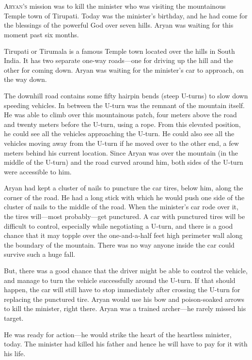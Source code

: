 
\chapter{}

\lettrine{A}{ryan's} mission was to kill the minister who was visiting the mountainous Temple
town of Tirupati. Today was the minister's birthday, and he had come for the
blessings of the powerful God over seven hills. Aryan was waiting for this
moment past six months.

Tirupati or Tirumala is a famous Temple town located over the hills in South
India. It has two separate one-way roads—one for driving up the hill
and the other for coming down. Aryan was waiting for the minister's car to
approach, on the way down.

The downhill road contains some fifty hairpin bends (steep U-turns) to slow down
speeding vehicles. In between the U-turn was the remnant of the mountain itself.
He was able to climb over this mountainous patch, four meters above the road and
twenty meters before the U-turn, using a rope. From this elevated position, he
could see all the vehicles approaching the U-turn. He could also see all the
vehicles moving away from the U-turn if he moved over to the other end, a few
meters behind his current location. Since Aryan was over the mountain (in the
middle of the U-turn) and the road curved around him, both sides of the U-turn
were accessible to him.

Aryan had kept a cluster of nails to puncture the car tires, below him, along
the corner of the road. He had a long stick with which he would push one side of
the cluster of nails to the middle of the road. When the minister's car rode
over it, the tires will—most probably—get punctured. A car with punctured
tires will be difficult to control, especially while negotiating a U-turn, and
there is a good chance that it may topple over the one-and-a-half feet high
perimeter wall along the boundary of the mountain. There was no way anyone
inside the car could survive such a huge fall.

But, there was a good chance that the driver might be able to control the
vehicle, and manage to turn the vehicle successfully around the U-turn. If that
should happen, the car will still have to stop immediately after crossing the
U-turn for replacing the punctured tire. Aryan would use his bow and
poison-soaked arrows to kill the minister, right there. Aryan was a trained
archer—he rarely missed his target.

He was ready for action—he would strike the heart of the heartless minister,
today. The minister had killed his father and hence he will have to pay for it
with his life.

